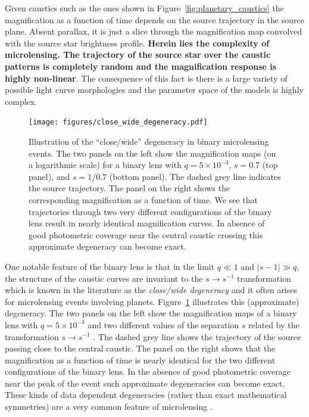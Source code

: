 \documentclass[12pt,dvipsnames]{report}
\begin{document}
Given caustics such as the ones shown in Figure~\ref{fig:planetary_caustics}
the magnification as a function of time depends on the source trajectory in the
source plane. Absent parallax, it is just a slice through the magnification map
convolved with the source star brightness profile. \textbf{Herein lies the
    complexity of microlensing. The trajectory of the source star over the caustic
    patterns is completely random and the magnification response is highly
    non-linear}. The consequence of this fact is there is a large variety of
possible light curve morphologies and the parameter space of the models is
highly complex.

\begin{figure}[t]
    \centering
    \texttt{[image: figures/close\_wide\_degeneracy.pdf]}
    \caption{Illustration of the ``close/wide'' degeneracy in binary microlensing events.
        The two panels on the left show the magnification maps (on a logarithmic scale) for
        a binary lens with $q=5\times 10^{-3}$, $s=0.7$ (top panel), and $s=1/0.7$
        (bottom panel). The dashed grey line indicates the source trajectory. The panel
        on the right shows the corresponding magnification as a function of time.
        We see that trajectories through two very different configurations of the binary lens
        result in nearly identical magnification curves. In absence of good
        photometric coverage near the central caustic crossing this approximate degeneracy
        can become exact.}
    \label{fig:close_wide_degeneracy}
\end{figure}

One notable feature of the binary lens is that in the limit $q\ll 1$ and
$\lvert s-1\rvert \gg q$, the structure of the caustic curves are invariant to
the $s\rightarrow s^{-1}$ transformation \citet{dominik1999} which is known in
the literature as the \emph{close/wide degeneracy} and it often arises for
microlensing events involving planets. Figure~\ref{fig:close_wide_degeneracy}
illustrates this (approximate) degeneracy. The two panels on the left show the
magnification maps of a binary lens with $q=5\times 10^{-3}$ and two different
values of the separation $s$ related by the transformation $s\rightarrow
    s^{-1}$ . The dashed grey line shows the trajectory of the source passing close
to the central caustic. The panel on the right shows that the magnification as
a function of time is nearly identical for the two different configurations of
the binary lens. In the absence of good photometric coverage near the peak of
the event such approximate degeneracies can become exact. These kinds of data
dependent degeneracies (rather than exact mathematical symmetries) are a very
common feature of microlensing \citep{erdl1993}.
\end{document}
